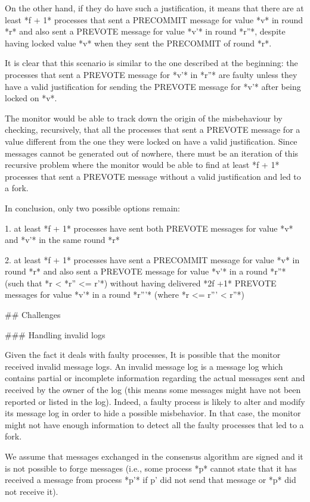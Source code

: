 \documentclass[a4paper,11pt,oneside]{report}
\begin{document}
\begin{markdown}
On the other hand, if they do have such a justification, it means that there are at least *f + 1* processes that sent a PRECOMMIT message for value *v* in round *r* and also sent a PREVOTE message for value *v'* in round *r''*, despite having locked value *v* when they sent the PRECOMMIT of round *r*.

It is clear that this scenario is similar to the one described at the beginning: the processes that sent a PREVOTE message for *v'* in *r''* are faulty unless they have a valid justification for sending the PREVOTE message for *v'* after being locked on *v*.

The monitor would be able to track down the origin of the misbehaviour by checking, recursively, that all the processes that sent a PREVOTE message for a value different from the one they were locked on have a valid justification.
Since messages cannot be generated out of nowhere, there must be an iteration of this recursive problem where the monitor would be able to find at least *f + 1* processes that sent a PREVOTE message without a valid justification and led to a fork.

In conclusion, only two possible options remain:

1. at least *f + 1* processes have sent both PREVOTE messages for value *v* and *v'* in the same round *r*

2. at least *f + 1* processes have sent a PRECOMMIT message for value *v* in round *r* and also sent a PREVOTE message for value *v'* in a round *r''* (such that *r < *r'' <= r'*) without having delivered *2f +1* PREVOTE messages for value *v'* in a round *r'''* (where *r <= r''' < r''*)

## Challenges

### Handling invalid logs

Given the fact it deals with faulty processes, It is possible that the monitor received invalid message logs. An invalid message log is a message log which contains partial or incomplete information regarding the actual messages sent and received by the owner of the log (this means some messages might have not been reported or listed in the log).
Indeed, a faulty process is likely to alter and modify its message log in order to hide a possible misbehavior. In that case, the monitor might not have enough information to detect all the faulty processes that led to a fork. 

We assume that messages exchanged in the consensus algorithm are signed and it is not possible to forge messages (i.e., some process *p* cannot state that it has received a message from process *p'* if p' did not send that message or *p* did not receive it). 


\end{markdown}
\end{document}

